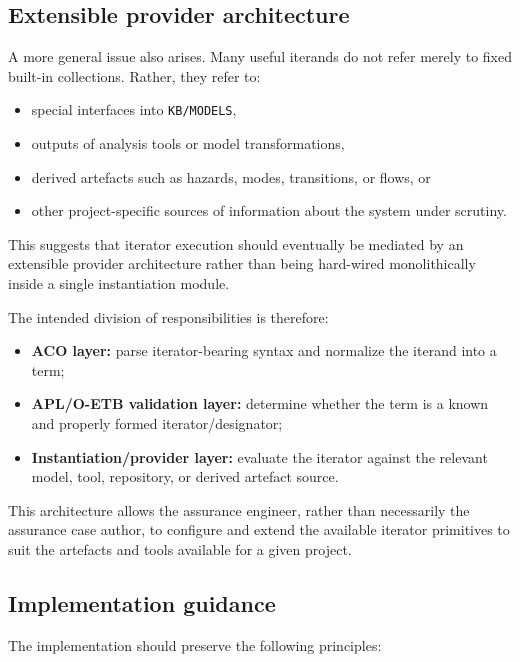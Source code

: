 \documentclass[12pt,twoside,a4paper]{article}
\begin{document}
\subsection{Extensible provider architecture}

A more general issue also arises.
Many useful iterands do not refer merely to fixed built-in collections.
Rather, they refer to:
\begin{itemize}
  \item special interfaces into \texttt{KB/MODELS},
  \item outputs of analysis tools or model transformations,
  \item derived artefacts such as hazards, modes, transitions, or flows, or
  \item other project-specific sources of information about the system under scrutiny.
\end{itemize}

This suggests that iterator execution should eventually be mediated by an extensible provider architecture rather than being hard-wired monolithically inside a single instantiation module.

The intended division of responsibilities is therefore:

\begin{itemize}
  \item \textbf{ACO layer:} parse iterator-bearing syntax and normalize the iterand into a term;
  \item \textbf{APL/O-ETB validation layer:} determine whether the term is a known and properly formed iterator/designator;
  \item \textbf{Instantiation/provider layer:} evaluate the iterator against the relevant model, tool, repository, or derived artefact source.
\end{itemize}

This architecture allows the assurance engineer, rather than necessarily the assurance case author, to configure and extend the available iterator primitives to suit the artefacts and tools available for a given project.

\subsection{Implementation guidance}

The implementation should preserve the following principles:
\end{document}
